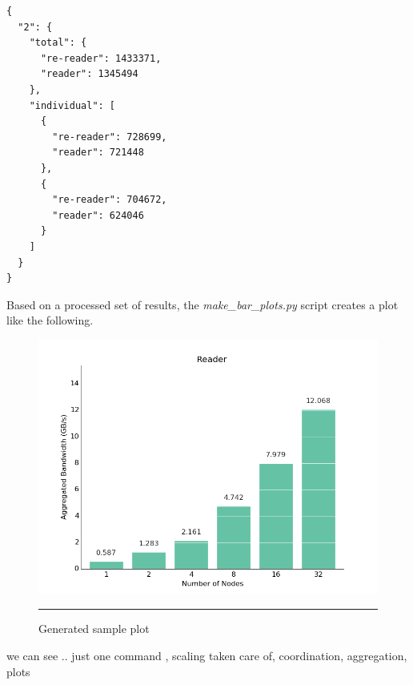\begin{verbatim}
{
  "2": {
    "total": {
      "re-reader": 1433371, 
      "reader": 1345494
    }, 
    "individual": [
      {
        "re-reader": 728699, 
        "reader": 721448
      }, 
      {
        "re-reader": 704672, 
        "reader": 624046
      }
    ]
  }
}
\end{verbatim}

Based on a processed set of results, the \textit{make\_bar\_plots.py} script creates a plot like the following.

\begin{figure}[H]
  \centering
    \includegraphics[scale=0.5]{Figures/reader.png}
    \rule{25em}{0.5pt}
  \caption[Generated sample plot]{Generated sample plot}
  \label{fig:architecture}
\end{figure}

we can see .. just one command , scaling taken care of, coordination, aggregation, plots
